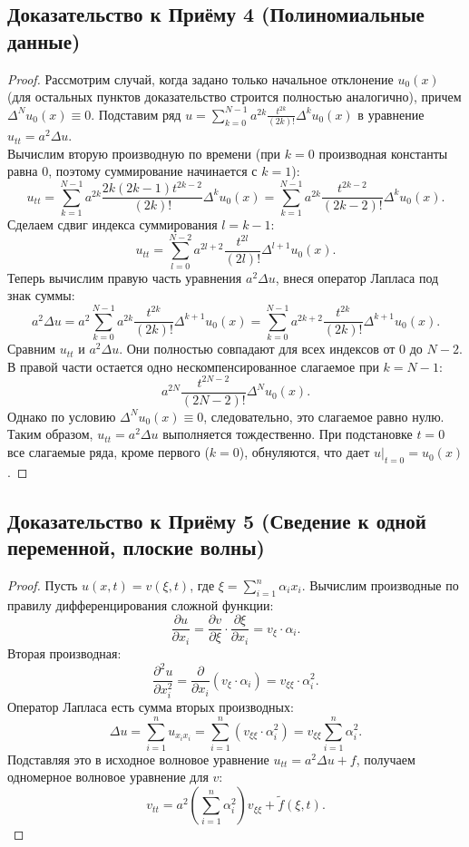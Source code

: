 \subsection*{Доказательство к Приёму 4 (Полиномиальные данные)}
\begin{proof}
Рассмотрим случай, когда задано только начальное отклонение $u_0(x)$ (для остальных пунктов доказательство строится полностью аналогично), причем $\Delta^N u_0(x) \equiv 0$. Подставим ряд $u = \sum_{k=0}^{N-1} a^{2k} \frac{t^{2k}}{(2k)!} \Delta^k u_0(x)$ в уравнение $u_{tt} = a^2\Delta u$. \\

Вычислим вторую производную по времени (при $k=0$ производная константы равна 0, поэтому суммирование начинается с $k=1$):
\[
u_{tt} = \sum_{k=1}^{N-1} a^{2k} \frac{2k(2k-1)t^{2k-2}}{(2k)!} \Delta^k u_0(x) = \sum_{k=1}^{N-1} a^{2k} \frac{t^{2k-2}}{(2k-2)!} \Delta^k u_0(x).
\]
Сделаем сдвиг индекса суммирования $l = k - 1$:
\[
u_{tt} = \sum_{l=0}^{N-2} a^{2l+2} \frac{t^{2l}}{(2l)!} \Delta^{l+1} u_0(x).
\]
Теперь вычислим правую часть уравнения $a^2\Delta u$, внеся оператор Лапласа под знак суммы:
\[
a^2\Delta u = a^2 \sum_{k=0}^{N-1} a^{2k} \frac{t^{2k}}{(2k)!} \Delta^{k+1} u_0(x) = \sum_{k=0}^{N-1} a^{2k+2} \frac{t^{2k}}{(2k)!} \Delta^{k+1} u_0(x).
\]
Сравним $u_{tt}$ и $a^2\Delta u$. Они полностью совпадают для всех индексов от $0$ до $N-2$. В правой части остается одно нескомпенсированное слагаемое при $k = N-1$:
\[
a^{2N} \frac{t^{2N-2}}{(2N-2)!} \Delta^N u_0(x).
\]
Однако по условию $\Delta^N u_0(x) \equiv 0$, следовательно, это слагаемое равно нулю. Таким образом, $u_{tt} = a^2\Delta u$ выполняется тождественно. При подстановке $t=0$ все слагаемые ряда, кроме первого ($k=0$), обнуляются, что дает $u|_{t=0} = u_0(x)$.
\end{proof}

\subsection*{Доказательство к Приёму 5 (Сведение к одной переменной, плоские волны)}
\begin{proof}
Пусть $u(x,t) = v(\xi, t)$, где $\xi = \sum_{i=1}^n \alpha_i x_i$. Вычислим производные по правилу дифференцирования сложной функции:
\[
\frac{\partial u}{\partial x_i} = \frac{\partial v}{\partial \xi} \cdot \frac{\partial \xi}{\partial x_i} = v_\xi \cdot \alpha_i.
\]
Вторая производная:
\[
\frac{\partial^2 u}{\partial x_i^2} = \frac{\partial}{\partial x_i} (v_\xi \cdot \alpha_i) = v_{\xi\xi} \cdot \alpha_i^2.
\]
Оператор Лапласа есть сумма вторых производных:
\[
\Delta u = \sum_{i=1}^n u_{x_i x_i} = \sum_{i=1}^n \left( v_{\xi\xi} \cdot \alpha_i^2 \right) = v_{\xi\xi} \sum_{i=1}^n \alpha_i^2.
\]
Подставляя это в исходное волновое уравнение $u_{tt} = a^2\Delta u + f$, получаем одномерное волновое уравнение для $v$:
\[
v_{tt} = a^2 \left(\sum_{i=1}^n \alpha_i^2 \right) v_{\xi\xi} + \tilde{f}(\xi, t).
\]
\end{proof}

